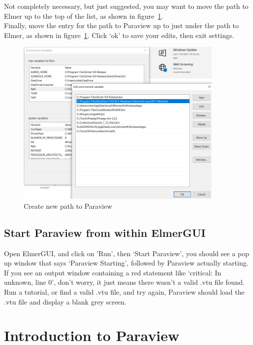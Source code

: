 Not completely necessary, but just suggested, you may want to move the path to 
Elmer up to the top of the list, as shown in figure~\ref{fg:path-5}.\\

Finally, move the entry for the path to Paraview up to just under the path to Elmer, as shown in figure~\ref{fg:path-5}.  Click `ok' to save your edits, then exit settings.

\begin{figure}[H]
\begin{center}
\includegraphics[width=0.9\textwidth]{path-5}
\caption{Create new path to Paraview}\label{fg:path-5}
\end{center}
\end{figure}

\section{Start Paraview from within ElmerGUI}

Open ElmerGUI, and click on 'Run', then `Start Paraview', you should see a pop up window that says `Paraview Starting', followed by Paraview actually starting.  If you see an output window containing a red statement like `critical: In unknown, line 0', don't worry, it just means there wasn't a valid .vtu file found.  Run a tutorial, or find a valid .vtu file, and try again, Paraview should load the .vtu file and display a blank grey screen.


\chapter{Introduction to Paraview}

